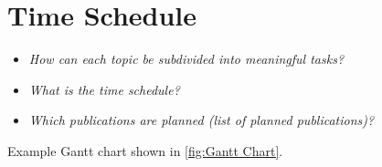 \section{Time Schedule}
\label{S:time_schedule}

\begin{itemize}
   \item \emph{How can each topic be subdivided into meaningful tasks?}
	\item \emph{What is the time schedule?}
	\item \emph{Which publications are planned (list of planned publications)?}
\end{itemize}

Example Gantt chart shown in \cref{fig:Gantt Chart}.

